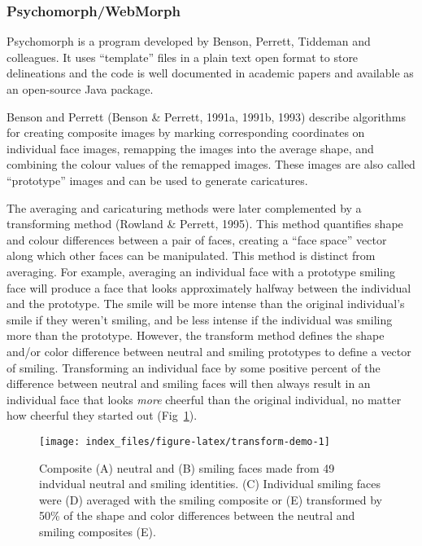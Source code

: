 \documentclass[
  doc,floatsintext]{apa6}
\begin{document}
\hypertarget{psychomorph}{%
\subsubsection{Psychomorph/WebMorph}\label{psychomorph}}

Psychomorph is a program developed by Benson, Perrett, Tiddeman and colleagues. It uses ``template'' files in a plain text open format to store delineations and the code is well documented in academic papers and available as an open-source Java package.

Benson and Perrett (Benson \& Perrett, 1991a, 1991b, 1993) describe algorithms for creating composite images by marking corresponding coordinates on individual face images, remapping the images into the average shape, and combining the colour values of the remapped images. These images are also called ``prototype'' images and can be used to generate caricatures.

The averaging and caricaturing methods were later complemented by a transforming method (Rowland \& Perrett, 1995). This method quantifies shape and colour differences between a pair of faces, creating a ``face space'' vector along which other faces can be manipulated. This method is distinct from averaging. For example, averaging an individual face with a prototype smiling face will produce a face that looks approximately halfway between the individual and the prototype. The smile will be more intense than the original individual's smile if they weren't smiling, and be less intense if the individual was smiling more than the prototype. However, the transform method defines the shape and/or color difference between neutral and smiling prototypes to define a vector of smiling. Transforming an individual face by some positive percent of the difference between neutral and smiling faces will then always result in an individual face that looks \emph{more} cheerful than the original individual, no matter how cheerful they started out (Fig~\ref{fig:transform-demo}).



\begin{figure}
\texttt{[image: index\_files/figure-latex/transform-demo-1]} \caption{Composite (A) neutral and (B) smiling faces made from 49 indvidual neutral and smiling identities. (C) Individual smiling faces were (D) averaged with the smiling composite or (E) transformed by 50\% of the shape and color differences between the neutral and smiling composites (E).}\label{fig:transform-demo}
\end{figure}
\end{document}
